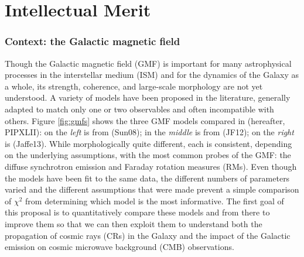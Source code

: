 
\section*{Intellectual Merit}


\subsubsection*{Context:  the Galactic magnetic field}\label{sec:gmfs}

Though the Galactic magnetic field (GMF) is important for many astrophysical processes in the interstellar medium (ISM) and for the dynamics of the Galaxy as a whole, its strength, coherence, and large-scale morphology are not yet understood.  A variety of models have been proposed in the literature, generally adapted to match only one or two observables and often incompatible with others. Figure \ref{fig:gmfs} shows the three GMF models compared in \citet{pipXLII} (hereafter, PIPXLII): on the {\it left} is from \citet{sun08} (Sun08); in the {\it middle} is from \citet{jansson12b} (JF12); on the {\it right} is \citet{Jaffe:2013} (Jaffe13). While morphologically quite different, each is consistent, depending on the underlying assumptions, with the most common probes of the GMF:  the diffuse synchrotron emission and Faraday rotation measures (RMs). Even though the models have been fit to the same data, the different numbers of parameters varied and the different assumptions that were made prevent a simple comparison of $\chi^2$ from determining which model is the most informative.  The first goal of this proposal is to quantitatively compare these models and from there to improve them so that we can then exploit them to understand both the propagation of cosmic rays (CRs) in the Galaxy and the impact of the Galactic emission on cosmic microwave background (CMB) observations.

